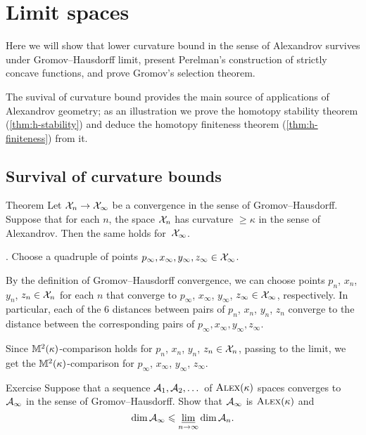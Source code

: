
\chapter{Limit spaces}\label{chap:lim}\label{chap:stability}


Here we will show that lower curvature bound in the sense of Alexandrov survives under Gromov--Hausdorff limit,
present Perelman's construction of strictly concave functions, and
prove Gromov's selection theorem.

The suvival of curvature bound provides the main source of applications of Alexandrov geometry;
as an illustration we prove the homotopy stability theorem (\ref{thm:h-stability}) and deduce the homotopy finiteness theorem (\ref{thm:h-finiteness}) from it.



\section{Survival of curvature bounds}

\begin{thm}{Theorem}\label{thm:CBB-closed}
Let $\mathcal{X}_n\to \mathcal{X}_\infty$ be a convergence in the sense of Gromov--Hausdorff.
Suppose that for each $n$, the space $\mathcal{X}_n$ has curvature $\ge\kappa$ in the sense of Alexandrov.
Then the same holds for~$\mathcal{X}_\infty$.
\end{thm}

.
Choose a quadruple of points $p_\infty, x_\infty,y_\infty,z_\infty\in \mathcal{X}_\infty$.

By the definition of Gromov--Hausdorff convergence, we can choose points $p_n$,  $x_n$, $y_n$, $z_n\in \mathcal{X}_n$ for each $n$
that converge to $p_\infty$, $x_\infty$, $y_\infty$, $z_\infty\in \mathcal{X}_\infty$, respectively.
In particular, each of the 6 distances between pairs of $p_n$, $x_n$, $y_n$, $z_n$ converge to the distance between the corresponding pairs of $p_\infty, x_\infty,y_\infty,z_\infty$.

Since $\mathbb{M}^2(\kappa)$-comparison holds for $p_n$, $x_n$, $y_n$, $z_n\in \mathcal{X}_n$,
passing to the limit, we get the $\mathbb{M}^2(\kappa)$-comparison for $p_\infty$,  $x_\infty$, $y_\infty$, $z_\infty$.
\qeds

\begin{thm}[!]{Exercise}\label{ex:dim-lim}
Suppose that a sequence $\mathcal{A}_1,\mathcal{A}_2,\dots$ of $\textsc{Alex}(\kappa)$ spaces converges to $\mathcal{A}_\infty$ in the sense of Gromov--Hausdorff.
Show that $\mathcal{A}_\infty$ is $\textsc{Alex}(\kappa)$ and
\[\operatorname{\rm dim}\nolimits \mathcal{A}_\infty\leqslant \varliminf_{n\to\infty} \operatorname{\rm dim}\nolimits \mathcal{A}_n.\]
\end{thm}

